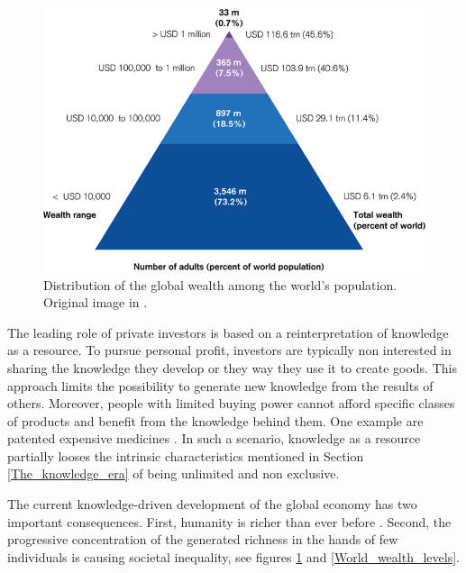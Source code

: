 \begin{figure}[!t] 
 \begin{center}
 \includegraphics[scale=0.42]{Images/Global_wealth_pyramid.png}
 \caption{Distribution of the global wealth among the world's population. Original image in \cite{Kersley}.}
 \label{Global_wealth_pyramid}
 \end{center}
\end{figure}

The leading role of private investors is based on a reinterpretation of knowledge as a resource. To pursue personal profit, investors are typically non interested in sharing the knowledge they develop or they way they use it to create goods. This approach limits the possibility to generate new knowledge from the results of others. Moreover, people with limited buying power cannot afford specific classes of products and benefit from the knowledge behind them. One example are patented expensive medicines \cite{Heller}. In such a scenario, knowledge as a resource partially looses the intrinsic characteristics mentioned in Section \ref{The_knowledge_era} of being unlimited and non exclusive. 

The current knowledge-driven development of the global economy has two important consequences. First, humanity is richer than ever before \cite{Maddison}. Second, the progressive concentration of the generated richness in the hands of few individuals is causing societal inequality, see figures \ref{Global_wealth_pyramid} and \ref{World_wealth_levels}. 

